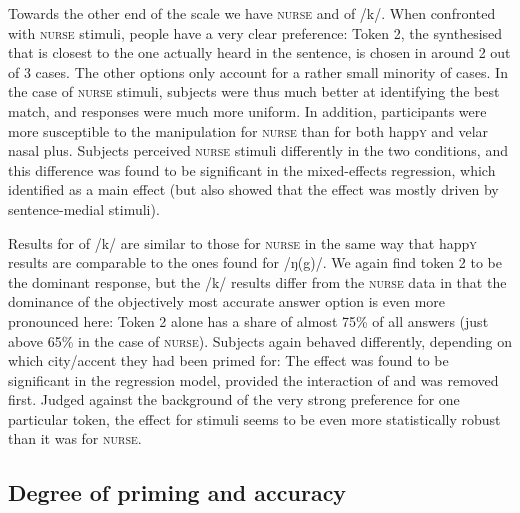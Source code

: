 Towards the other end of the scale we have \textsc{nurse} and  of /k/.
When confronted with \textsc{nurse} stimuli, people have a very clear preference: Token 2, the synthesised  that is closest to the one actually heard in the sentence, is chosen in around 2 out of 3 cases.
The other options only account for a rather small minority of cases.
In the case of \textsc{nurse} stimuli, subjects were thus much better at identifying the best match, and responses were much more uniform.
In addition, participants were more susceptible to the  manipulation for \textsc{nurse} than for both happ\textsc{y} and velar nasal plus.
Subjects perceived \textsc{nurse} stimuli differently in the two  conditions, and this difference was found to be significant in the mixed-effects regression, which identified  as a main effect (but also showed that the effect was mostly driven by sentence-medial stimuli).

Results for  of /k/ are similar to those for \textsc{nurse} in the same way that happ\textsc{y} results are comparable to the ones found for /ŋ(g)/.
We again find token 2 to be the dominant response, but the /k/ results differ from the \textsc{nurse} data in that the dominance of the objectively most accurate answer option is even more pronounced here: Token 2 alone has a share of almost 75\% of all answers (just above 65\% in the case of \textsc{nurse}).
Subjects again behaved differently, depending on which city/accent they had been primed for: The  effect was found to be significant in the regression model, provided the interaction of  and  was removed first.
Judged against the background of the very strong preference for one particular token, the  effect for  stimuli seems to be even more statistically robust than it was for \textsc{nurse}.

		\subsection{Degree of priming and accuracy}

